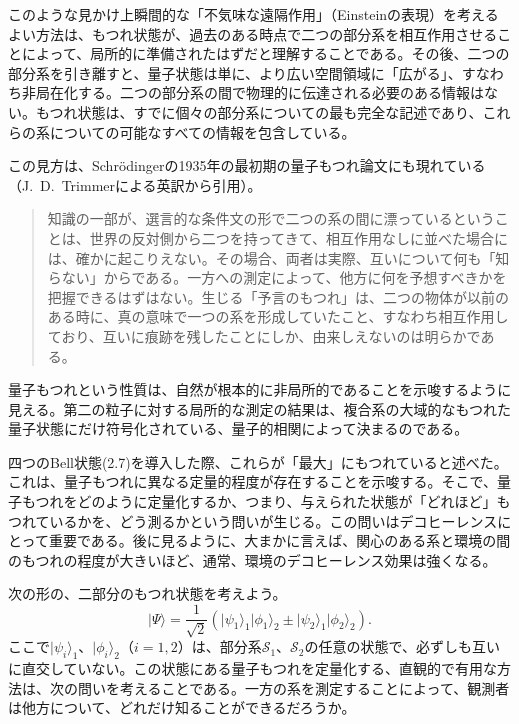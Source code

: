 このような見かけ上瞬間的な「不気味な遠隔作用」（Einsteinの表現）を考えるよい方法は、もつれ状態が、過去のある時点で二つの部分系を相互作用させることによって、局所的に準備されたはずだと理解することである。その後、二つの部分系を引き離すと、量子状態は単に、より広い空間領域に「広がる」、すなわち非局在化する。二つの部分系の間で物理的に伝達される必要のある情報はない。もつれ状態は、すでに個々の部分系についての最も完全な記述であり、これらの系についての可能なすべての情報を包含している。

この見方は、Schrödingerの1935年の最初期の量子もつれ論文\cite{ref002}にも現れている（J.~D.~Trimmerによる英訳\cite{ref057}から引用）。
\hypertarget{srcpage:32}{}\label{srcpage:32}
\begin{quote}
知識の一部が、選言的な条件文の形で二つの系の間に漂っているということは、世界の反対側から二つを持ってきて、相互作用なしに並べた場合には、確かに起こりえない。その場合、両者は実際、互いについて何も「知らない」からである。一方への測定によって、他方に何を予想すべきかを把握できるはずはない。生じる「予言のもつれ」は、二つの物体が以前のある時に、真の意味で一つの系を形成していたこと、すなわち相互作用しており、互いに痕跡を残したことにしか、由来しえないのは明らかである。
\end{quote}

量子もつれという性質は、自然が根本的に非局所的であることを示唆するように見える。第二の粒子に対する局所的な測定の結果は、複合系の大域的なもつれた量子状態にだけ符号化されている、量子的相関によって決まるのである。

四つのBell状態(2.7)を導入した際、これらが「最大」にもつれていると述べた。これは、量子もつれに異なる定量的程度が存在することを示唆する。そこで、量子もつれをどのように定量化するか、つまり、与えられた状態が「どれほど」もつれているかを、どう測るかという問いが生じる。この問いはデコヒーレンスにとって重要である。後に見るように、大まかに言えば、関心のある系と環境の間のもつれの程度が大きいほど、通常、環境のデコヒーレンス効果は強くなる。

次の形の、二部分のもつれ状態を考えよう。
\begin{equation}\lvert\Psi\rangle=\frac1{\sqrt2}(\lvert\psi_1\rangle_1\lvert\phi_1\rangle_2\pm\lvert\psi_2\rangle_1\lvert\phi_2\rangle_2).\tag{2.9}\end{equation}
ここで$\lvert\psi_i\rangle_1$、$\lvert\phi_i\rangle_2$（$i=1,2$）は、部分系$\mathcal S_1$、$\mathcal S_2$の任意の状態で、必ずしも互いに直交していない。この状態にある量子もつれを定量化する、直観的で有用な方法は、次の問いを考えることである。一方の系を測定することによって、観測者は他方について、どれだけ知ることができるだろうか。

